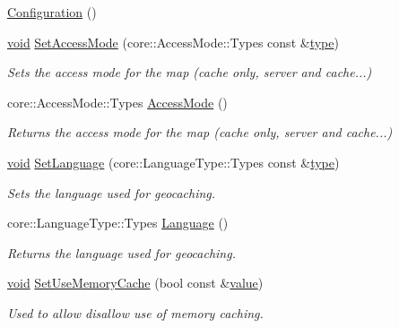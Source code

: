 \begin{DoxyCompactItemize}
\item 
\hyperlink{group___o_p_map_widget_ga0963ae98b690172299a36a61ee003c21}{Configuration} ()
\item 
\hyperlink{group___u_a_v_objects_plugin_ga444cf2ff3f0ecbe028adce838d373f5c}{void} \hyperlink{group___o_p_map_widget_ga41001a3e8948832246f19baf28c45e68}{Set\-Access\-Mode} (core\-::\-Access\-Mode\-::\-Types const \&\hyperlink{glext_8h_a7d05960f4f1c1b11f3177dc963a45d86}{type})
\begin{DoxyCompactList}\small\item\em Sets the access mode for the map (cache only, server and cache...) \end{DoxyCompactList}\item 
core\-::\-Access\-Mode\-::\-Types \hyperlink{group___o_p_map_widget_ga902ee11abd0b7c7634bfbadf5bd73517}{Access\-Mode} ()
\begin{DoxyCompactList}\small\item\em Returns the access mode for the map (cache only, server and cache...) \end{DoxyCompactList}\item 
\hyperlink{group___u_a_v_objects_plugin_ga444cf2ff3f0ecbe028adce838d373f5c}{void} \hyperlink{group___o_p_map_widget_ga29b42ec96098c35b537e64d33d6c41b5}{Set\-Language} (core\-::\-Language\-Type\-::\-Types const \&\hyperlink{glext_8h_a7d05960f4f1c1b11f3177dc963a45d86}{type})
\begin{DoxyCompactList}\small\item\em Sets the language used for geocaching. \end{DoxyCompactList}\item 
core\-::\-Language\-Type\-::\-Types \hyperlink{group___o_p_map_widget_ga0058ff0ad6bf530d4e7ce0399a14a39c}{Language} ()
\begin{DoxyCompactList}\small\item\em Returns the language used for geocaching. \end{DoxyCompactList}\item 
\hyperlink{group___u_a_v_objects_plugin_ga444cf2ff3f0ecbe028adce838d373f5c}{void} \hyperlink{group___o_p_map_widget_ga323ea9b6071044204ce278734ef855fb}{Set\-Use\-Memory\-Cache} (bool const \&\hyperlink{glext_8h_aa0e2e9cea7f208d28acda0480144beb0}{value})
\begin{DoxyCompactList}\small\item\em Used to allow disallow use of memory caching. \end{DoxyCompactList}\item 

\end{DoxyCompactItemize}
